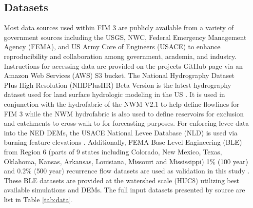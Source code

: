 \subsection{Datasets}
\label{ssec:datasets}
%
Most data sources used within FIM 3 are publicly available from a variety of government sources including the USGS, NWC, Federal Emergency Management Agency (FEMA), and US Army Core of Engineers (USACE) to enhance reproducibility and collaboration among government, academia, and industry.
Instructions for accessing data are provided on the projects GitHub page via an Amazon Web Services (AWS) S3 bucket.
The National Hydrography Dataset Plus High Resolution (NHDPlusHR) Beta Version is the latest hydrography dataset used for land surface hydrologic modeling in the US \cite{moore2019user}. 
It is used in conjunction with the hydrofabric of the NWM V2.1 to help define flowlines for FIM 3 while the NWM hydrofabric is also used to define reservoirs for exclusion and catchments to cross-walk to for forecasting purposes.
For enforcing levee data into the NED DEMs, the USACE National Levee Database (NLD) is used via burning feature elevations \cite{engineers2016national}.
Additionally, FEMA Base Level Engineering (BLE) from Region 6 (parts of 9 states including Colorado, New Mexico, Texas, Oklahoma, Kansas, Arkansas, Louisiana, Missouri and Mississippi) 1\% (100 year) and 0.2\% (500 year) recurrence flow datasets are used as validation in this study \cite{fema2021base,fema2021estimated}. 
These BLE datasets are provided at the watershed scale (HUC8) utilizing best available simulations and DEMs.
The full input datasets presented by source are list in Table \ref{tab:data}.
%
